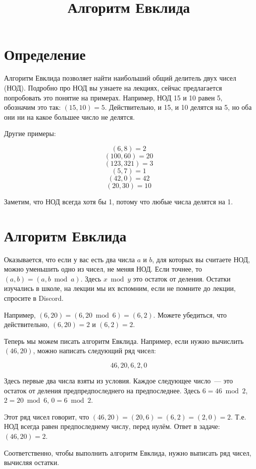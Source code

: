 \documentclass{article}
\title{Алгоритм Евклида}
\author{}
\date{}
\begin{document}
    \maketitle


    \section{Определение}
    Алгоритм Евклида позволяет найти наибольший общий делитель двух чисел (НОД).
    Подробно про НОД вы узнаете на лекциях, сейчас предлагается попробовать это понятие на примерах.
    Например, НОД 15 и 10 равен 5, обозначим это так: $(15, 10) = 5$.
    Действительно, и 15, и 10 делятся на 5, но оба они ни на какое большее число не делятся.

    Другие примеры:

    \[(6, 8) = 2\]
    \[(100, 60) = 20\]
    \[(123, 321) = 3\]
    \[(5, 7) = 1\]
    \[(42, 0) = 42\]
    \[(20, 30) = 10\]

    Заметим, что НОД всегда хотя бы 1, потому что любые числа делятся на 1.


    \section{Алгоритм Евклида}

    Оказывается, что если у вас есть два числа $a$ и $b$, для которых вы считаете НОД, можно уменьшить одно
    из чисел, не меняя НОД.
    Если точнее, то $(a, b) = (a, b \bmod a)$.
    Здесь $x \bmod y$ это остаток от деления.
    Остатки изучались в школе, на лекции мы их вспомним, если не помните до лекции, спросите в Discord.

    Например, $(6, 20) = (6, 20 \bmod 6) = (6, 2)$.
    Можете убедиться, что действительно, $(6, 20) = 2$ и $(6, 2) = 2$.

    Теперь мы можем писать алгоритм Евклида.
    Например, если нужно вычислить $(46, 20)$, можно написать следующий ряд чисел:

    \[46, 20, 6, 2, 0\]

    Здесь первые два числа взяты из условия.
    Каждое следующее число~--- это остаток от деления предпредпоследнего на предпоследнее.
    Здесь $6 = 46 \bmod 2$, $2 = 20 \bmod 6$, $0 = 6 \bmod 2$.

    Этот ряд чисел говорит, что $(46, 20) = (20, 6) = (6, 2) = (2, 0) = 2$.
    Т.е. НОД всегда равен предпоследнему числу, перед нулём. Ответ в задаче: $(46, 20) = 2$.

    Соответственно, чтобы выполнить алгоритм Евклида, нужно выписать ряд чисел, вычисляя остатки.
\end{document}
